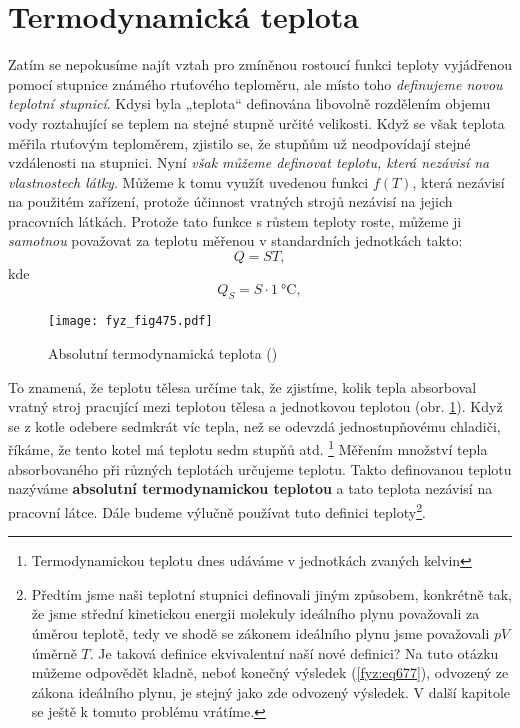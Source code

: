   \section{Termodynamická teplota}\label{fyz:IchapXLIVsecV}
    Zatím se nepokusíme najít vztah pro zmíněnou rostoucí funkci teploty vyjádřenou pomocí stupnice
    známého rtuťového teploměru, ale místo toho \emph{deﬁnujeme novou teplotní stupnicí}. Kdysi byla
    „teplota“ deﬁnována libovolně rozdělením objemu vody roztahující se teplem na stejné stupně
    určité velikosti. Když se však teplota měřila rtuťovým teploměrem, zjistilo se, že stupňům už
    neodpovídají stejné vzdálenosti na stupnici. Nyní \emph{však můžeme deﬁnovat teplotu, která
    nezávisí na vlastnostech látky}. Můžeme k tomu využít uvedenou funkci \(f(T)\), která nezávisí
    na použitém zařízení, protože účinnost vratných strojů nezávisí na jejich pracovních látkách.
    Protože tato funkce s růstem teploty roste, můžeme ji \emph{samotnou} považovat za teplotu
    měřenou v standardních jednotkách takto:
    \begin{equation}\label{fyz:eq691}
      Q=ST,
    \end{equation}
    kde
    \begin{equation}\label{fyz:eq692}
      Q_S=S\cdot\SI{1}{\celsius},
    \end{equation}

    \begin{figure}[ht!] %
      \centering
      \texttt{[image: fyz\_fig475.pdf]}
      \caption{Absolutní termodynamická teplota (\cite[s.~707]{Feynman01})}
      \label{fyz:fig475}
    \end{figure}

    To znamená, že teplotu tělesa určíme tak, že zjistíme, kolik tepla absorboval vratný stroj
    pracující mezi teplotou tělesa a jednotkovou teplotou (obr. \ref{fyz:fig475}). Když se z kotle
    odebere sedmkrát víc tepla, než se odevzdá jednostupňovému chladiči, říkáme, že tento kotel má
    teplotu sedm stupňů atd. \footnote{Termodynamickou teplotu dnes udáváme v jednotkách zvaných
    kelvin} Měřením množství tepla absorbovaného při různých teplotách určujeme teplotu. Takto
    deﬁnovanou teplotu nazýváme \textbf{absolutní termodynamickou teplotou} a tato teplota nezávisí
    na pracovní látce. Dále budeme výlučně používat tuto deﬁnici teploty\footnote{Předtím jsme naši
    teplotní stupnici definovali jiným způsobem, konkrétně tak, že jsme střední kinetickou energii
    molekuly ideálního plynu považovali za úměrou teplotě, tedy ve shodě se zákonem ideálního plynu
    jsme považovali \(pV\) úměrně \(T\). Je taková definice ekvivalentní naší nové definici? Na tuto
    otázku můžeme odpovědět kladně, neboť konečný výsledek (\ref{fyz:eq677}), odvozený ze zákona
    ideálního plynu, je stejný jako zde odvozený výsledek. V další kapitole se ještě k tomuto
    problému vrátíme.}.

